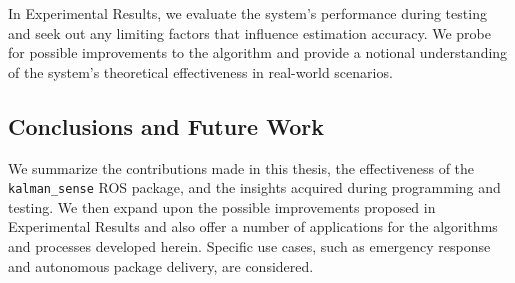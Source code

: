 In Experimental Results, we evaluate the system's performance during testing and seek out any limiting factors that influence estimation accuracy. We probe for possible improvements to the algorithm and provide a notional understanding of the system's theoretical effectiveness in real-world scenarios.

\subsection*{Conclusions and Future Work}

We summarize the contributions made in this thesis, the effectiveness of the \texttt{kalman\_sense} ROS package, and the insights acquired during programming and testing. We then expand upon the possible improvements proposed in Experimental Results and also offer a number of applications for the algorithms and processes developed herein. Specific use cases, such as emergency response and autonomous package delivery, are considered.